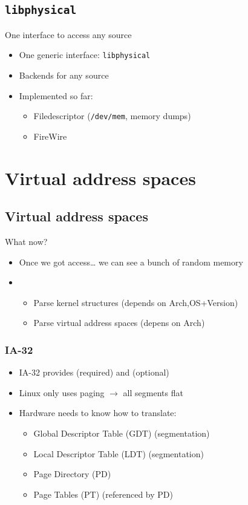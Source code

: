 \documentclass{beamer}
\newenvironment{itemizeframe}[1]
  {\begin{frame}{#1}\startitemizeframe}
  {\stopitemizeframe\end{frame}}
\newcommand\startitemizeframe{\begin{itemize}}
\newcommand\stopitemizeframe{\end{itemize}}
\begin{document}
	\subsection{\texttt{libphysical}}

		\begin{itemizeframe}{One interface to access any source}
			\item One generic interface: \texttt{libphysical}
			\item Backends for any source
			\item Implemented so far:
			\begin{itemize}
				\item Filedescriptor (\texttt{/dev/mem}, memory dumps)
				\item FireWire
			\end{itemize}
		\end{itemizeframe}


\section{Virtual address spaces}

	\subsection{Virtual address spaces}

		\begin{itemizeframe}{What now?}
			\item Once we got access\ldots
				we can see a bunch of random memory

			\item {}
				\begin{itemize}
					\item Parse kernel structures (depends on Arch,OS+Version)
					\item Parse virtual address spaces (depens on Arch)
				\end{itemize}
		\end{itemizeframe}

		\begin{frame} \frametitle{IA-32}
			\begin{itemize}
				\item IA-32 provides  (required) and  (optional)
				\item Linux only uses paging $\rightarrow$ all segments flat

				\item Hardware needs to know how to translate:
				\begin{itemize}
					\item Global Descriptor Table (GDT) (segmentation)
					\item Local Descriptor Table (LDT) (segmentation)
					\item Page Directory (PD)
					\item Page Tables (PT) (referenced by PD)
				\end{itemize}
			\end{itemize}
		\end{frame}
\end{document}

